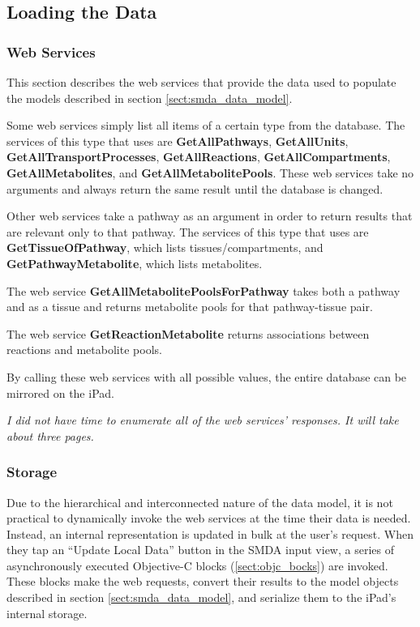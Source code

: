 \subsection{Loading the Data}
\label{sect:smda_all_data}

\subsubsection{Web Services}
\label{sect:smda_web_services}

This section describes the web services that provide the data used to populate
the models described in section \ref{sect:smda_data_model}.

Some web services simply list all items of a certain type from the database. The
services of this type that \mawapp uses are \textbf{GetAllPathways},
\textbf{GetAllUnits}, \textbf{GetAllTransportProcesses},
\textbf{GetAllReactions}, \textbf{GetAllCompartments},
\textbf{GetAllMetabolites}, and \textbf{GetAllMetabolitePools}. These web
services take no arguments and always return the same result until the database
is changed.

Other web services take a pathway as an argument in order to return results that
are relevant only to that pathway. The services of this type that \mawapp uses
are \textbf{GetTissueOfPathway}, which lists tissues/compartments, and
\textbf{GetPathwayMetabolite}, which lists metabolites.

The web service \textbf{GetAllMetabolitePoolsForPathway} takes both a pathway
and as a tissue and returns metabolite pools for that pathway-tissue pair.

The web service \textbf{GetReactionMetabolite} returns associations between
reactions and metabolite pools.

By calling these web services with all possible values, the entire database can
be mirrored on the iPad.

\emph{I did not have time to enumerate all of the web services' responses. It
will take about three pages.}

\subsubsection{Storage}

Due to the hierarchical and interconnected nature of the data model, it is not
practical to dynamically invoke the web services at the time their data is
needed. Instead, an internal representation is updated in bulk at the user's
request. When they tap an ``Update Local Data'' button in the SMDA input view, a
series of asynchronously executed Objective-C blocks (\ref{sect:objc_bocks}) are
invoked. These blocks make the web requests, convert their results to the model
objects described in section \ref{sect:smda_data_model}, and serialize them to
the iPad's internal storage.


